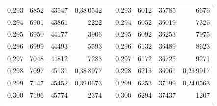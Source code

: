 \begin{tabular}{|c|c|c|r|@{}p{9pt}@{}|c|c|c|r|}
0,293 & 6852 & 43547 & 0,38\,0542 &  & 0,293 & 6012 & 35785 & 6676 \\
0,294 & 6901 & 43861 & 2222 &  & 0,294 & 6052 & 36019 & 7326 \\
0,295 & 6950 & 44177 & 3906 &  & 0,295 & 6092 & 36253 & 7975 \\[3pt]
0,296 & 6999 & 44493 & 5593 &  & 0,296 & 6132 & 36489 & 8623 \\
0,297 & 7048 & 44812 & 7283 &  & 0,297 & 6172 & 36725 & 9271 \\
0,298 & 7097 & 45131 & 0,38\,8977 &  & 0,298 & 6213 & 36961 & 0,23\,9917 \\
0,299 & 7147 & 45452 & 0,39\,0673 &  & 0,299 & 6253 & 37199 & 0,24\,0563 \\
0,300 & 7196 & 45774 & 2374 &  & 0,300 & 6294 & 37437 & 1207 \\
\hline
\end{tabular}\par
\endgroup

